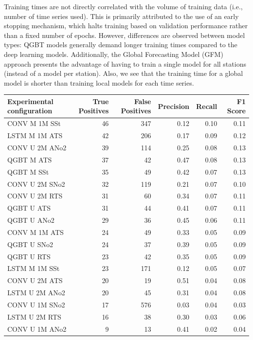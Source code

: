 \documentclass[12pt,a4paper]{book}
\begin{document}
Training times are not directly correlated with the volume of training data (i.e., number of time series used). This is primarily attributed to the use of an early stopping mechanism, which halts training based on validation performance rather than a fixed number of epochs. However, differences are observed between model types: QGBT models generally demand longer training times compared to the deep learning models. Additionally, the Global Forecasting Model (GFM) approach presents the advantage of having to train a single model for all stations (instead of a model per station). Also, we see that the training time for a global model is shorter than training local models for each time series.

\begin{table}[h]
\centering
\begin{tabular}{lrrrrr}
\toprule
 Experimental configuration & True Positives & False Positives & Precision & Recall & F1 Score \\
\midrule
CONV M 1M SSt & 46 & 347 & 0.12 & 0.10 & 0.11 \\
LSTM M 1M ATS & 42 & 206 & 0.17 & 0.09 & 0.12 \\
CONV U 2M ANo2 & 39 & 114 & 0.25 & 0.08 & 0.13 \\
QGBT M ATS & 37 & 42 & 0.47 & 0.08 & 0.13 \\
QGBT M SSt & 35 & 49 & 0.42 & 0.07 & 0.13 \\
    CONV U 2M SNo2 & 32 & 119 & 0.21 & 0.07 & 0.10 \\
    CONV U 2M RTS & 31 & 60 & 0.34 & 0.07 & 0.11 \\
    QGBT U ATS & 31 & 44 & 0.41 & 0.07 & 0.11 \\
    QGBT U ANo2 & 29 & 36 & 0.45 & 0.06 & 0.11 \\
    CONV M 1M ATS & 24 & 49 & 0.33 & 0.05 & 0.09 \\
    QGBT U SNo2 & 24 & 37 & 0.39 & 0.05 & 0.09 \\
    QGBT U RTS & 23 & 42 & 0.35 & 0.05 & 0.09 \\
    LSTM M 1M SSt & 23 & 171 & 0.12 & 0.05 & 0.07 \\
    CONV U 2M ATS & 20 & 19 & 0.51 & 0.04 & 0.08 \\
    LSTM U 2M ANo2 & 20 & 45 & 0.31 & 0.04 & 0.08 \\
    CONV U 1M SNo2 & 17 & 576 & 0.03 & 0.04 & 0.03 \\
    LSTM U 2M RTS & 16 & 38 & 0.30 & 0.03 & 0.06 \\
    CONV U 1M ANo2 & 9 & 13 & 0.41 & 0.02 & 0.04 \\

\end{tabular}
\end{table}
\end{document}
